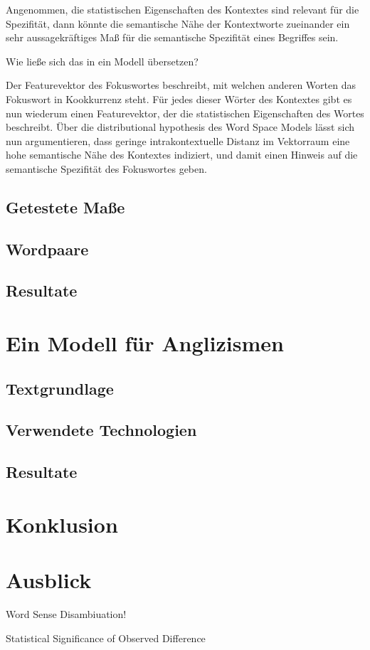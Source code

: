\documentclass[11pt,numbers=noenddot]{scrartcl}
\begin{document}
Angenommen, die statistischen Eigenschaften des Kontextes sind relevant für die Spezifität, dann könnte die semantische Nähe der Kontextworte zueinander ein sehr aussagekräftiges Maß für die semantische Spezifität eines Begriffes sein.

Wie ließe sich das in ein Modell übersetzen?

Der Featurevektor des Fokuswortes beschreibt, mit welchen anderen Worten das Fokuswort in Kookkurrenz steht. Für jedes dieser Wörter des Kontextes gibt es nun wiederum einen Featurevektor, der die statistischen Eigenschaften des Wortes beschreibt. Über die distributional hypothesis des Word Space Models lässt sich nun argumentieren, dass geringe intrakontextuelle Distanz im Vektorraum eine hohe semantische Nähe des Kontextes indiziert, und damit einen Hinweis auf die semantische Spezifität des Fokuswortes geben.

\subsection{Getestete Maße}

\subsection{Wordpaare}

\subsection{Resultate}

\section{Ein Modell für Anglizismen}

\subsection{Textgrundlage}

\subsection{Verwendete Technologien}

\subsection{Resultate}

\section{Konklusion}

\section{Ausblick}

Word Sense Disambiuation!

Statistical Significance of Observed Difference

\nocite{han2011}
\nocite{heyer2008}
\nocite{manning1999}


\end{document}

